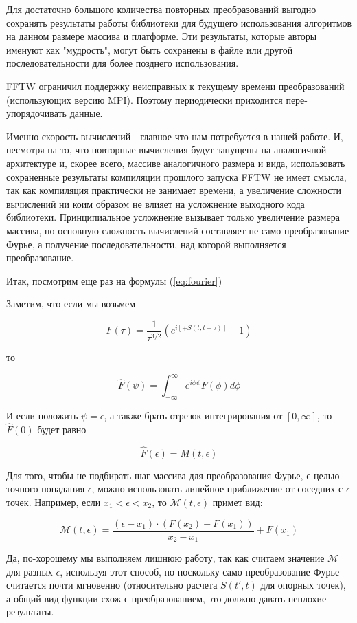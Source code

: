\documentclass[14pt]{extarticle}
\newcommand{\cM}{\mathcal{M}}
\begin{document}
Для достаточно большого количества повторных преобразований выгодно сохранять результаты работы библиотеки для будущего использования алгоритмов на данном размере массива и платформе. Эти результаты, которые авторы именуют как "мудрость", могут быть сохранены в файле или другой последовательности для более позднего использования.

FFTW ограничил поддержку неисправных к текущему времени преобразований (использующих версию MPI). Поэтому периодически приходится пере-упорядочивать данные.

Именно скорость вычислений - главное что нам потребуется в нашей работе. И, несмотря на то, что повторные вычисления будут запущены на аналогичной архитектуре и, скорее всего, массиве аналогичного размера и вида, использовать сохраненные результаты компиляции прошлого запуска FFTW не имеет смысла, так как компиляция практически не занимает времени, а увеличение сложности вычислений ни коим образом не влияет на усложнение выходного кода библиотеки. Принципиальное усложнение вызывает только увеличение размера массива, но основную сложность вычислений составляет не само преобразование Фурье, а получение последовательности, над которой выполняется преобразование.

Итак, посмотрим еще раз на формулы (\ref{eq:fourier})

Заметим, что если мы возьмем 

$$ 
F(\tau) = \frac{1}{{\tau}^{3/2}}(e^{i [+ S(t, t-\tau)]} - 1)
$$

то

$$
\hat{F}(\psi) = \int_{-\infty}^{\infty} e^{i \phi \psi} F(\phi) d\phi
$$

И если положить $\psi = \epsilon$, а также брать отрезок интегрирования от $[0, \infty]$, то $\hat{F}(0)$ будет равно

$$
\hat{F}(\epsilon) = M(t, \epsilon)
$$

Для того, чтобы не подбирать шаг массива для преобразования Фурье, с целью точного попадания $\epsilon$, можно использовать линейное приближение от соседних с $\epsilon$ точек. Например, если $x_1<\epsilon<x_2$, то $\cM(t, \epsilon)$ примет вид: 

$$
\cM(t, \epsilon) = \frac{(\epsilon - x_1) \cdot (F(x_2) - F(x_1))}{x_2 - x_1} + F(x_1)
$$

Да, по-хорошему мы выполняем лишнюю работу, так как считаем значение $\cM$ для разных $\epsilon$, используя этот способ, но поскольку само преобразование Фурье считается почти мгновенно (относительно расчета $S(t', t)$ для опорных точек), а общий вид функции схож с преобразованием, это должно давать неплохие результаты.
\end{document}
